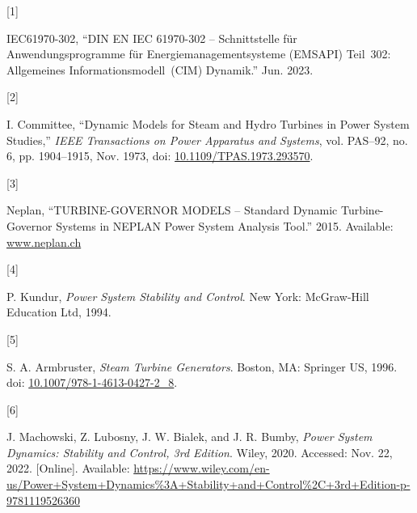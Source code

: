 \documentclass[
  a4paper,
  DIV=11,
  numbers=noendperiod]{scrartcl}
\newlength{\cslhangindent}
\newlength{\csllabelwidth}
\newenvironment{CSLReferences}[2] %
 {\begin{list}{}{%
  \setlength{\itemindent}{0pt}
  \setlength{\leftmargin}{0pt}
  \setlength{\parsep}{0pt}
  \ifodd #1
   \setlength{\leftmargin}{\cslhangindent}
   \setlength{\itemindent}{-1\cslhangindent}
  \fi
  \setlength{\itemsep}{#2\baselineskip}}}
 {\end{list}}
\newcommand{\CSLLeftMargin}[1]{\parbox[t]{\csllabelwidth}{\strut#1\strut}}
\newcommand{\CSLRightInline}[1]{\parbox[t]{\linewidth - \csllabelwidth}{\strut#1\strut}}
\begin{document}
\label{refs}
\begin{CSLReferences}{0}{0}
\CSLLeftMargin{{[}1{]} }%
\CSLRightInline{IEC61970-302, {``{DIN EN IEC} 61970-302 --
{Schnittstelle} für {Anwendungsprogramme} für {Energiemanagementsysteme}
({EMS}­{API}) {Teil}~302: {Allgemeines Informationsmodell}~({CIM})
{Dynamik}.''} Jun. 2023.}

\CSLLeftMargin{{[}2{]} }%
\CSLRightInline{I. Committee, {``Dynamic {Models} for {Steam} and {Hydro
Turbines} in {Power System Studies},''} \emph{IEEE Transactions on Power
Apparatus and Systems}, vol. PAS--92, no. 6, pp. 1904--1915, Nov. 1973,
doi:
\href{https://doi.org/10.1109/TPAS.1973.293570}{10.1109/TPAS.1973.293570}.}

\CSLLeftMargin{{[}3{]} }%
\CSLRightInline{Neplan, {``{TURBINE-GOVERNOR MODELS} -- {Standard
Dynamic Turbine-Governor Systems} in {NEPLAN Power System Analysis
Tool}.''} 2015. Available: \href{https://www.neplan.ch}{www.neplan.ch}}

\CSLLeftMargin{{[}4{]} }%
\CSLRightInline{P. Kundur, \emph{Power System Stability and Control}.
New York: McGraw-Hill Education Ltd, 1994.}

\CSLLeftMargin{{[}5{]} }%
\CSLRightInline{S. A. Armbruster, \emph{Steam {Turbine Generators}}.
Boston, MA: Springer US, 1996. doi:
\href{https://doi.org/10.1007/978-1-4613-0427-2_8}{10.1007/978-1-4613-0427-2\_8}.}

\CSLLeftMargin{{[}6{]} }%
\CSLRightInline{J. Machowski, Z. Lubosny, J. W. Bialek, and J. R. Bumby,
\emph{Power {System Dynamics}: {Stability} and {Control}, 3rd
{Edition}}. Wiley, 2020. Accessed: Nov. 22, 2022. {[}Online{]}.
Available:
\url{https://www.wiley.com/en-us/Power+System+Dynamics\%3A+Stability+and+Control\%2C+3rd+Edition-p-9781119526360}}

\end{CSLReferences}
\end{document}

